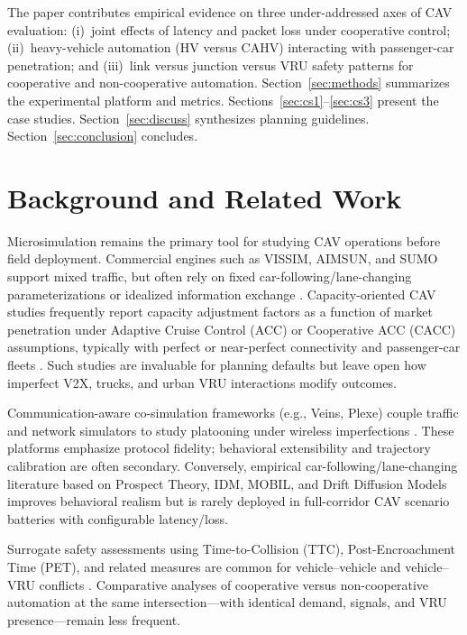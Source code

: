 \documentclass[numbered]{trbunofficial}
\begin{document}
The paper contributes empirical evidence on three under-addressed axes of CAV evaluation:
(i)~joint effects of latency and packet loss under cooperative control; (ii)~heavy-vehicle
automation (HV versus CAHV) interacting with passenger-car penetration; and (iii)~link versus
junction versus VRU safety patterns for cooperative and non-cooperative automation.
Section~\ref{sec:methods} summarizes the experimental platform and metrics.
Sections~\ref{sec:cs1}--\ref{sec:cs3} present the case studies. Section~\ref{sec:discuss}
synthesizes planning guidelines. Section~\ref{sec:conclusion} concludes.

\section{Background and Related Work}
\label{sec:related}
Microsimulation remains the primary tool for studying CAV operations before field deployment.
Commercial engines such as VISSIM, AIMSUN, and SUMO support mixed traffic, but often rely on
fixed car-following/lane-changing parameterizations or idealized information exchange
\cite{Krajzewski2012,ptvvissim2024}. Capacity-oriented CAV studies frequently report capacity
adjustment factors as a function of market penetration under Adaptive Cruise Control (ACC) or
Cooperative ACC (CACC) assumptions, typically with perfect or near-perfect connectivity and
passenger-car fleets \cite{Adebisi202X}. Such studies are invaluable for planning defaults but
leave open how imperfect V2X, trucks, and urban VRU interactions modify outcomes.

Communication-aware co-simulation frameworks (e.g., Veins, Plexe) couple traffic and network
simulators to study platooning under wireless imperfections \cite{segata2014plexe}. These
platforms emphasize protocol fidelity; behavioral extensibility and trajectory calibration are
often secondary. Conversely, empirical car-following/lane-changing literature based on
Prospect Theory, IDM, MOBIL, and Drift Diffusion Models improves behavioral realism
\cite{Treiber2000,Kesting2007,Talebpour2015,Ratcliff2008} but is rarely deployed in
full-corridor CAV scenario batteries with configurable latency/loss.

Surrogate safety assessments using Time-to-Collision (TTC), Post-Encroachment Time (PET), and
related measures are common for vehicle--vehicle and vehicle--VRU conflicts
\cite{Gettman2008SSAM,Lenard2018}. Comparative analyses of cooperative versus non-cooperative
automation at the same intersection---with identical demand, signals, and VRU presence---remain
less frequent.
\end{document}
